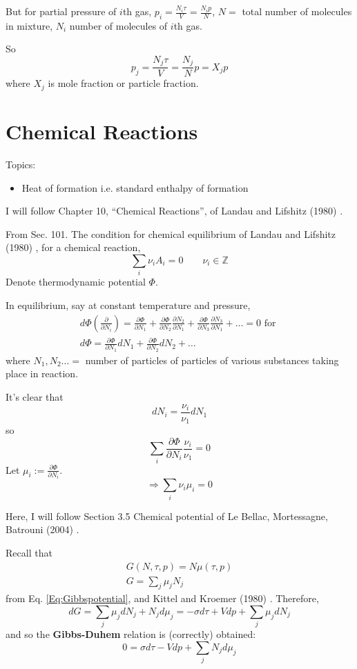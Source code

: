 \documentclass[10pt]{amsart}
\begin{document}
\begin{multicols*}{2}
But for partial pressure of $i$th gas, $p_i = \frac{N_i\tau}{V} = \frac{N_i p}{N}$, $N = $ total number of molecules in mixture, $N_i$ number of molecules of $i$th gas.  

So
\[
p_j = \frac{ N_j \tau }{V} = \frac{ N_j}{N} p = X_j p 
\]
where $X_j$ is mole fraction or particle fraction.  




\section{Chemical Reactions}
Topics:
\begin{itemize}
  \item Heat of formation i.e. standard enthalpy of formation
\end{itemize}

I will follow Chapter 10, ``Chemical Reactions'', of Landau and Lifshitz (1980) \cite{LLandauELifshitz1980}.  

From Sec. 101. The condition for chemical equilibrium of Landau and Lifshitz (1980) \cite{LLandauELifshitz1980}, for a chemical reaction,
\[
\sum_i \nu_i A_i = 0 \qquad \nu_i \in \mathbb{Z}
\]
Denote thermodynamic potential $\Phi$.  

In equilibrium, say at constant temperature and pressure, 
\[
\begin{gathered}
  d\Phi\left( \frac{ \partial }{ \partial N_i} \right) = \frac{ \partial \Phi}{ \partial N_1} + \frac{ \partial \Phi}{ \partial N_2} \frac{ \partial N_2}{ \partial N_1} + \frac{ \partial \Phi}{ \partial N_3} \frac{ \partial N_3}{ \partial N_1} + \dots = 0 \text{ for }  \\
  d\Phi = \frac{ \partial \Phi}{ \partial N_1} dN_1 + \frac{ \partial \Phi}{ \partial N_2} dN_2 + \dots 
\end{gathered}
\]
where $N_1, N_2 \dots =$ number of particles of particles of various substances taking place in reaction. 

It's clear that 
\[
dN_i = \frac{ \nu_i}{ \nu_1} dN_1
\]
so 
\[
\sum_i \frac{ \partial \Phi}{ \partial N_i} \frac{ \nu_i}{ \nu_1} = 0 
\]
Let $\mu_i := \frac{ \partial \Phi}{ \partial N_i}$.  
\begin{equation}
\Longrightarrow \sum_i \nu_i \mu_i = 0 
\end{equation}

Here, I will follow Section 3.5 Chemical potential of Le Bellac, Mortessagne, Batrouni (2004) \cite{MLeBellacFMortessagneGBatrouni2004}.  

Recall that 
\[
\begin{gathered}
  G(N,\tau,p) = N\mu(\tau,p) \\
  G = \sum_j \mu_j N_j 
\end{gathered}
\]
from Eq. \ref{Eq:Gibbspotential}, and Kittel and Kroemer (1980) \cite{CKittelHKroemer1980}.  Therefore,
\[
dG = \sum_j \mu_j dN_j + N_j d\mu_j = -\sigma d\tau + Vdp + \sum_j \mu_j dN_j
\]
and so the \textbf{Gibbs-Duhem} relation is (correctly) obtained:
\begin{equation}\label{Eq:Gibbs-Duhem}
  0 = \sigma d\tau - V dp + \sum_j N_j d\mu_j
\end{equation}


\end{multicols*}
\end{document}
